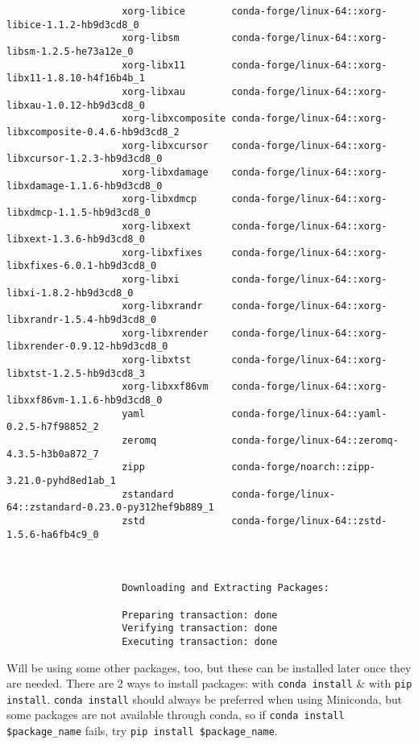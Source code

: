 \documentclass{article}
\begin{document}
\begin{enumerate}
\begin{itemize}
\begin{itemize}
\begin{itemize}
\begin{verbatim}
					xorg-libice        conda-forge/linux-64::xorg-libice-1.1.2-hb9d3cd8_0 
					xorg-libsm         conda-forge/linux-64::xorg-libsm-1.2.5-he73a12e_0 
					xorg-libx11        conda-forge/linux-64::xorg-libx11-1.8.10-h4f16b4b_1 
					xorg-libxau        conda-forge/linux-64::xorg-libxau-1.0.12-hb9d3cd8_0 
					xorg-libxcomposite conda-forge/linux-64::xorg-libxcomposite-0.4.6-hb9d3cd8_2 
					xorg-libxcursor    conda-forge/linux-64::xorg-libxcursor-1.2.3-hb9d3cd8_0 
					xorg-libxdamage    conda-forge/linux-64::xorg-libxdamage-1.1.6-hb9d3cd8_0 
					xorg-libxdmcp      conda-forge/linux-64::xorg-libxdmcp-1.1.5-hb9d3cd8_0 
					xorg-libxext       conda-forge/linux-64::xorg-libxext-1.3.6-hb9d3cd8_0 
					xorg-libxfixes     conda-forge/linux-64::xorg-libxfixes-6.0.1-hb9d3cd8_0 
					xorg-libxi         conda-forge/linux-64::xorg-libxi-1.8.2-hb9d3cd8_0 
					xorg-libxrandr     conda-forge/linux-64::xorg-libxrandr-1.5.4-hb9d3cd8_0 
					xorg-libxrender    conda-forge/linux-64::xorg-libxrender-0.9.12-hb9d3cd8_0 
					xorg-libxtst       conda-forge/linux-64::xorg-libxtst-1.2.5-hb9d3cd8_3 
					xorg-libxxf86vm    conda-forge/linux-64::xorg-libxxf86vm-1.1.6-hb9d3cd8_0 
					yaml               conda-forge/linux-64::yaml-0.2.5-h7f98852_2 
					zeromq             conda-forge/linux-64::zeromq-4.3.5-h3b0a872_7 
					zipp               conda-forge/noarch::zipp-3.21.0-pyhd8ed1ab_1 
					zstandard          conda-forge/linux-64::zstandard-0.23.0-py312hef9b889_1 
					zstd               conda-forge/linux-64::zstd-1.5.6-ha6fb4c9_0 
					
					
					
					Downloading and Extracting Packages:
					
					Preparing transaction: done                                                     
					Verifying transaction: done                                                     
					Executing transaction: done
				\end{verbatim}
				Will be using some other packages, too, but these can be installed later once they are needed. There are 2 ways to install packages: with {\tt conda install} \& with {\tt pip install}. {\tt conda install} should always be preferred when using Miniconda, but some packages are not available through conda, so if \verb|conda install $package_name| fails, try \verb|pip install $package_name|.
				

\end{itemize}
\end{itemize}
\end{itemize}
\end{enumerate}
\end{document}
